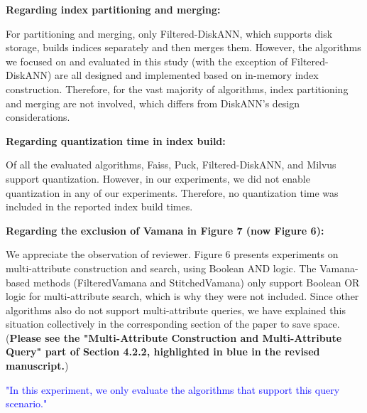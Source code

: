 \documentclass[sigconf, nonacm]{acmart}
\newcounter{observation}[section]
\begin{document}
\textbf{Regarding index partitioning and merging:}

For partitioning and merging, only Filtered-DiskANN, which supports disk storage, builds indices separately and then merges them. However, the algorithms we focused on and evaluated in this study (with the exception of Filtered-DiskANN) are all designed and implemented based on in-memory index construction. Therefore, for the vast majority of algorithms, index partitioning and merging are not involved, which differs from DiskANN's design considerations.

\textbf{Regarding quantization time in index build:}

Of all the evaluated algorithms, Faiss, Puck, Filtered-DiskANN, and Milvus support quantization. However, in our experiments, we did not enable quantization in any of our experiments. Therefore, no quantization time was included in the reported index build times.

\textbf{Regarding the exclusion of Vamana in Figure 7 (now Figure 6):}

We appreciate the observation of reviewer. Figure 6 presents experiments on multi-attribute construction and search, using Boolean AND logic. The Vamana-based methods (FilteredVamana and StitchedVamana) only support Boolean OR logic for multi-attribute search, which is why they were not included. Since other algorithms also do not support multi-attribute queries, we have explained this situation collectively in the corresponding section of the paper to save space. (\textbf{Please see the "Multi-Attribute Construction and Multi-Attribute Query" part of Section 4.2.2, highlighted in blue in the revised manuscript.})

\textcolor{blue}{"In this experiment, we only evaluate the algorithms that support this query scenario."}


\end{document}
